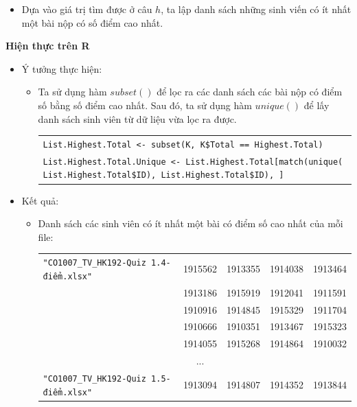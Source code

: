 \documentclass[a4paper]{article}
\theoremstyle{definition}
\begin{document}
\begin{enumerate}[a)]
\begin{itemize}
        \begin{itemize}
            \item Dựa vào giá trị tìm được ở câu $h$, ta lập danh sách những sinh viến có ít nhất một bài nộp có số điểm cao nhất.
        \end{itemize}
    \end{itemize}
    \bf Hiện thực trên R\normalfont
    \begin{itemize}
        \item Ý tưởng thực hiện:
        \begin{itemize}
            \item Ta sử dụng hàm $subset()$ để lọc ra các danh sách các bài nộp có điểm số bằng số điểm cao nhất. Sau đó, ta sử dụng hàm $unique()$ để lấy danh sách sinh viên từ dữ liệu vừa lọc ra được.
            \begin{center}
                \begin{tabular}{p{13cm}}
                    \texttt{List.Highest.Total <- subset(K, K\$Total == Highest.Total)}\\
                    \texttt{List.Highest.Total.Unique <- List.Highest.Total[match(unique( List.Highest.Total\$ID), List.Highest.Total\$ID), ]}
                \end{tabular}
            \end{center}
        \end{itemize}
        \item Kết quả:
        \begin{itemize}
            \item Danh sách các sinh viên có ít nhất một bài có điểm số cao nhất của mỗi file:
            \begin{center}
                \begin{tabular}{l c c c c}
                     \texttt{"CO1007\_TV\_HK192-Quiz 1.4-điểm.xlsx"} & 1915562 & 1913355 & 1914038 & 1913464\\
                     & 1913186 & 1915919 & 1912041 & 1911591\\
                     & 1910916 & 1914845 & 1915329 & 1911704\\
                     & 1910666 & 1910351 & 1913467 & 1915323\\
                     & 1914055 & 1915268 & 1914864 & 1910032\\
                     & ...\\
                     \texttt{"CO1007\_TV\_HK192-Quiz 1.5-điểm.xlsx"} & 1913094 & 1914807 & 1914352 & 1913844 \\

\end{tabular}
\end{center}
\end{itemize}
\end{itemize}
\end{enumerate}
\end{document}
